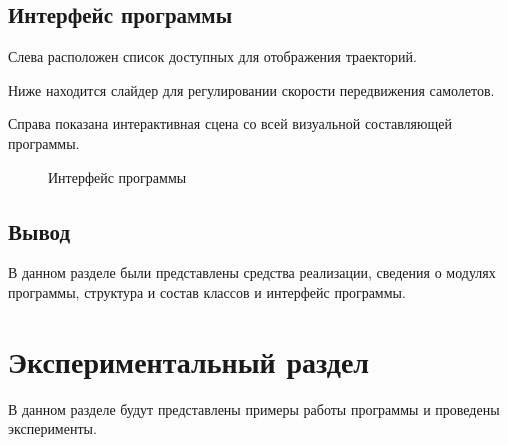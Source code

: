 \documentclass[14pt, a4paper]{extarticle}
\begin{document}
	\subsection{Интерфейс программы}
	Слева расположен список доступных для отображения траекторий.\par
	Ниже находится слайдер для регулировании скорости передвижения самолетов.\par
	Справа показана интерактивная сцена со всей визуальной составляющей программы.
	
	\begin{figure}[h!]
		\caption{Интерфейс программы}
	\end{figure}	

	\subsection*{Вывод}
	В данном разделе были представлены средства реализации, сведения о
	модулях программы, структура и состав классов и интерфейс программы.
	
	\newpage
	\section{Экспериментальный раздел}
	В данном разделе будут представлены примеры работы программы и
	проведены эксперименты.
	
\end{document}
